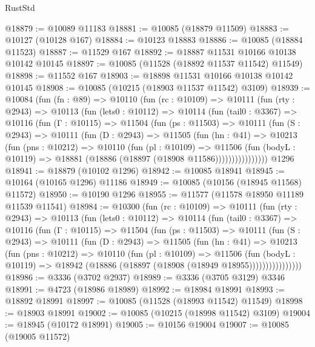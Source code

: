 \begin{lexlean}{RustStd}
\begin{coremodule}
@18879 := @10089 @11183
@18881 := @10085 (@18879 @11509)
@18883 := @10127 (@10128 @167)
@18884 := @10123 @18883
@18886 := @10085 (@18884 @11523)
@18887 := @11529 @167
@18892 := @18887 @11531 @10166 @10138 @10142 @10145
@18897 := @10085 (@11528 (@18892 @11537 @11542) @11549)
@18898 := @11552 @167
@18903 := @18898 @11531 @10166 @10138 @10142 @10145
@18908 := @10085 (@10215 (@18903 @11537 @11542) @3109)
@18939 := @10084
    (fun (fn : @89) =>
    @10110
      (fun (rc : @10109) =>
      @10111
        (fun (rty : @2943) =>
        @10113
          (fun (lets0 : @10112) =>
          @10114
            (fun (tail0 : @3367) =>
            @10116
              (fun (Γ : @10115) =>
              @11504
                (fun (ps : @11503) =>
                @10111
                  (fun (S : @2943) =>
                  @10111
                    (fun (D : @2943) =>
                    @11505
                      (fun (hn : @41) =>
                      @10213
                        (fun (pns : @10212) =>
                        @10110
                          (fun (pl : @10109) =>
                          @11506
                            (fun (bodyL : @10119) =>
                            @18881 (@18886 (@18897 (@18908 @11586))))))))))))))))
    @1296
@18941 := @18879 (@10102 @1296)
@18942 := @10085 @18941
@18945 := @10164 (@10165 @1296) @11186
@18949 := @10085 (@10156 (@18945 @11568) @11572)
@18950 := @10190 @1296
@18955 := @11577 (@11578 @18950 @11189 @11539 @11541)
@18984 := @10300
    (fun (rc : @10109) =>
    @10111
      (fun (rty : @2943) =>
      @10113
        (fun (lets0 : @10112) =>
        @10114
          (fun (tail0 : @3367) =>
          @10116
            (fun (Γ : @10115) =>
            @11504
              (fun (ps : @11503) =>
              @10111
                (fun (S : @2943) =>
                @10111
                  (fun (D : @2943) =>
                  @11505
                    (fun (hn : @41) =>
                    @10213
                      (fun (pns : @10212) =>
                      @10110
                        (fun (pl : @10109) =>
                        @11506
                          (fun (bodyL : @10119) =>
                          @18942 (@18886 (@18897 (@18908 (@18949 @18955))))))))))))))))
@18986 := @3336 (@3702 @2937)
@18989 := @3336 (@3705 @3129) @3346
@18991 := @4723 (@18986 @18989)
@18992 := @18984 @18991
@18993 := @18892 @18991
@18997 := @10085 (@11528 (@18993 @11542) @11549)
@18998 := @18903 @18991
@19002 := @10085 (@10215 (@18998 @11542) @3109)
@19004 := @18945 (@10172 @18991)
@19005 := @10156 @19004
@19007 := @10085 (@19005 @11572)

\end{coremodule}
\end{lexlean}
